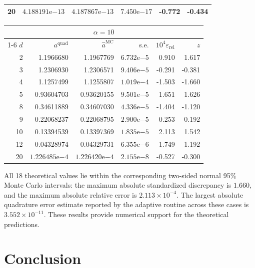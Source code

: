 \documentclass[a4paper,fleqn]{cas-dc}
\theoremstyle{definition}
\theoremstyle{remark}
\newcommand{\0}{\mathbf{0}}
\begin{document}
\begin{table}[pos=htbp]
\begin{minipage}[t]{0.495\linewidth}
\begin{tabular}{@{}rrrrrr@{}}
20 & $4.188191\mathrm{e}{-13}$& $4.187867\mathrm{e}{-13}$& $7.450\mathrm{e}{-17}$ & -0.772 & -0.434\\
\bottomrule
\end{tabular}
\end{minipage}%
\hfill
\begin{minipage}[t]{0.495\linewidth}
\centering
\begin{tabular}{@{}rrrrrr@{}}
\toprule
\multicolumn{6}{c}{$\alpha=10$}\\
\cmidrule(lr){1-6}
$d$ & $a^{\mathrm{quad}}$ & $\widehat a^{\mathrm{MC}}$ & s.e. &
$10^4\varepsilon_{\mathrm{rel}}$ & $z$\\
\midrule
 2 & 1.1966680  & 1.1967769  & $6.732\mathrm{e}{-5}$ &  0.910 &  1.617\\
 3 & 1.2306930  & 1.2306571  & $9.406\mathrm{e}{-5}$ & -0.291 & -0.381\\
 4 & 1.1257499  & 1.1255807  & $1.019\mathrm{e}{-4}$ & -1.503 & -1.660\\
 5 & 0.93604703 & 0.93620155 & $9.501\mathrm{e}{-5}$ &  1.651 &  1.626\\
 8 & 0.34611889 & 0.34607030 & $4.336\mathrm{e}{-5}$ & -1.404 & -1.120\\
 9 & 0.22068237 & 0.22068795 & $2.900\mathrm{e}{-5}$ &  0.253 &  0.192\\
10 & 0.13394539 & 0.13397369 & $1.835\mathrm{e}{-5}$ &  2.113 &  1.542\\
12 & 0.04328974 & 0.04329731 & $6.355\mathrm{e}{-6}$ &  1.749 &  1.192\\
20 & $1.226485\mathrm{e}{-4}$ & $1.226420\mathrm{e}{-4}$ & $2.155\mathrm{e}{-8}$ & -0.527 & -0.300\\
\bottomrule
\end{tabular}
\end{minipage}
\endgroup
\end{table}

All 18 theoretical values lie within the corresponding two-sided normal
95\% Monte Carlo intervals: the maximum absolute standardized discrepancy is
$1.660$, and the maximum absolute relative error is
$2.113\times10^{-4}$. The largest absolute quadrature error estimate reported
by the adaptive routine across these cases is $3.552\times10^{-11}$. 
These results provide numerical support for the theoretical predictions.  







\section{Conclusion}
\label{sec:conclusion}
\end{document}
